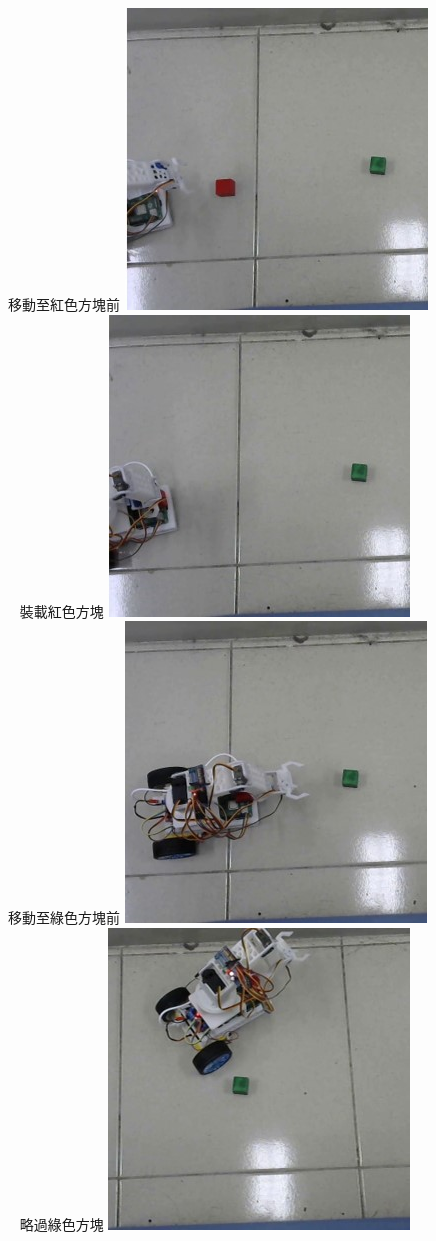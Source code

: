 \documentclass[class=NCU_thesis, crop=false]{standalone}
\begin{document}
\newpage
\begin{figure}[h]
    \centering
    \subcaptionbox
        {移動至紅色方塊前
        \label{fig:fig-dataset-contrast-after-adjustment}}
        {\includegraphics[width=0.4\linewidth]{figures/DRIVE (1).jpg}}
    ~    
    \subcaptionbox
        {裝載紅色方塊
        \label{fig:fig-dataset-contrast-after-adjustment}}
        {\includegraphics[width=0.4\linewidth]{figures/DRIVE (2).jpg}}
    ~
    \subcaptionbox
        {移動至綠色方塊前
        \label{fig:fig-dataset-contrast-after-adjustment}}
        {\includegraphics[width=0.4\linewidth]{figures/DRIVE (3).jpg}}
    ~
    \subcaptionbox
        {略過綠色方塊
        \label{fig:fig-dataset-contrast-after-adjustment}}
        {\includegraphics[width=0.4\linewidth]{figures/DRIVE (4).jpg}}

\end{figure}
\end{document}
